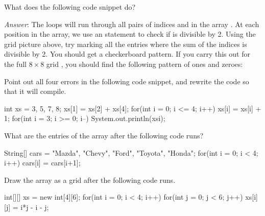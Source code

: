 \begin{example}
What does the following code snippet do?

\noindent \emph{Answer}: The  loops will run through all pairs of indices  and  in the array . At each position in the array, we use an  statement to check if  is divisible by 2. Using the grid picture above, try marking all the entries where the sum of the indices is divisible by 2. You should get a checkerboard pattern. If you carry this out for the full $8\times 8$ grid , you should find the following pattern of ones and zeroes:
\begin{center}
\end{center}
\end{example}

\exercisesection

\begin{exercise}
Point out all four errors in the following code snippet, and rewrite the code so that it will compile.

\begin{code}
int xs = {3, 5, 7, 8};
xs[1] = xs[2] + xs[4];
for(int i = 0; i <= 4; i++) {
    xs[i] = xs[i] + 1;
}
for(int i = 3; i >= 0; i--) {
    System.out.println(xs{i});
}
\end{code}
\end{exercise}

\begin{exercise}
What are the entries of the array  after the following code runs?
\begin{code}
String[] cars = {"Mazda", "Chevy", "Ford", "Toyota", "Honda"};
for(int i = 0; i < 4; i++) {
    cars[i] = cars[i+1];
}
\end{code}
\end{exercise}

\begin{exercise}
Draw the array  as a grid after the following code runs.
\begin{code}
int[][] xs = new int[4][6];
for(int i = 0; i < 4; i++) {
    for(int j = 0; j < 6; j++) {
        xs[i][j] = i*j - i - j;
    }
}
\end{code}
\end{exercise}

